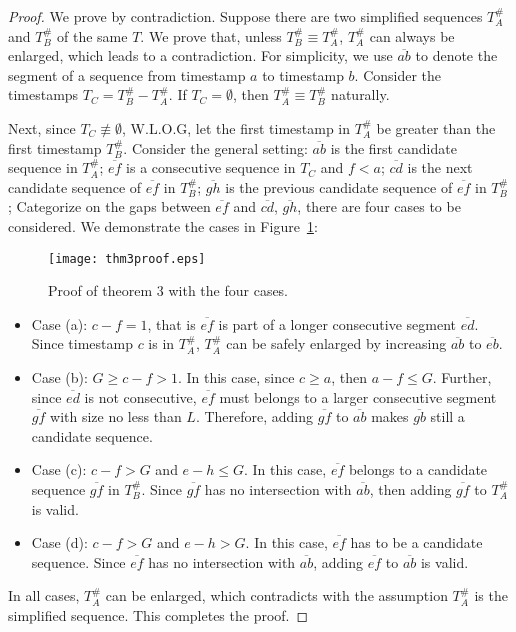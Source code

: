 \begin{proof}
We prove by contradiction. Suppose there are two simplified sequences $T_A^\#$ and $T_B^\#$ of the same $T$. We prove that, unless $T_B^\# \equiv T_A^\#$, $T_A^\#$ can always be enlarged, which leads to a contradiction. For simplicity, we use $\overline{ab}$ to denote the segment of a sequence from timestamp $a$ to timestamp $b$.
Consider the timestamps $T_C=T_B^\# - T_A^\#$. If $T_C = \emptyset$, then $T_A^\# \equiv T_B^\#$ naturally.

Next, since $T_C \not \equiv \emptyset$, W.L.O.G, let the first timestamp in $T_A^\#$ be greater than the first timestamp $T_B^\#$. Consider the general setting: $\overline{ab}$ is the first candidate sequence in $T_A^\#$;  $\overline{ef}$
is a consecutive sequence in $T_C$ and $f < a$; $\overline{cd}$ is the next candidate sequence of $\overline{ef}$ in $T_B^\#$; $\overline{gh}$ is the previous candidate sequence of $\overline{ef}$ in $T_B^\#$; Categorize on the gaps between $\overline{ef}$ and  $\overline{cd}$, $\overline{gh}$,
there are four cases to be considered. 
We demonstrate the cases in Figure~\ref{fig:proof_thm_3}:
\begin{figure}[h]
\centering
\texttt{[image: thm3proof.eps]}
\caption{Proof of theorem 3 with the four cases.}
\label{fig:proof_thm_3}
\end{figure}
\begin{itemize}
\item Case (a): $c-f = 1$, that is $\overline{ef}$ is part of a longer consecutive segment $\overline{ed}$. Since timestamp $c$ is in $T_A^\#$, $T_A^\#$ can be safely enlarged by increasing $\overline{ab}$ to $\overline{eb}$.
\item Case (b): $G \geq c-f> 1$. In this case, since $c\geq a$, then $a-f \leq G$. Further, since $\overline{ed}$ is not 
consecutive, $\overline{ef}$ must belongs to a larger consecutive segment $\overline{gf}$ with size no less than $L$. Therefore, adding $\overline{gf}$ to $\overline{ab}$ makes $\overline{gb}$ still a candidate sequence.
\item Case (c): $c-f > G$ and $e-h \leq G$. In this case, $\overline{ef}$ belongs to a candidate sequence $\overline{gf}$ in $T_B^\#$.  Since $\overline{gf}$ has no intersection with $\overline{ab}$, then adding $\overline{gf}$ to $T_A^\#$ is valid.
\item Case (d): $c-f > G$ and $ e- h > G$. In this case,  $\overline{ef}$ has to be a candidate sequence. Since $\overline{ef}$ has no intersection with $\overline{ab}$, adding $\overline{ef}$ to $\overline{ab}$ is valid.
\end{itemize}
In all cases, $T_A^\#$ can be enlarged, which contradicts with the assumption $T_A^\#$ is the simplified sequence. This completes the proof.
\end{proof}



